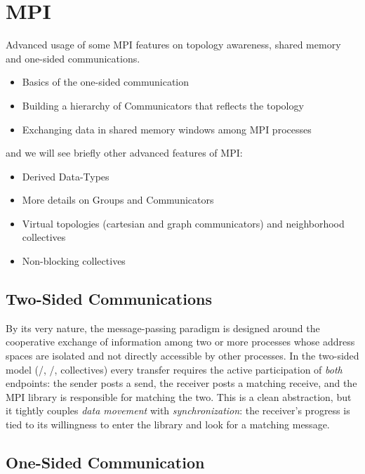 \chapter{MPI}

Advanced usage of some MPI features on topology awareness, shared memory and one-sided communications.

\begin{itemize}
    \item Basics of the one-sided communication
    \item Building a hierarchy of Communicators that reflects the topology
    \item Exchanging data in shared memory windows among MPI processes
\end{itemize}

and we will see briefly other advanced features of MPI:
\begin{itemize}
    \item Derived Data-Types
    \item More details on Groups and Communicators
    \item Virtual topologies (cartesian and graph communicators) and neighborhood collectives
    \item Non-blocking collectives
\end{itemize}

\section{Two-Sided Communications}

By its very nature, the message-passing paradigm is designed around the cooperative exchange of information among two or more processes whose address spaces are isolated and not directly accessible by other processes. In the two-sided model (/, /, collectives) every transfer requires the active participation of \emph{both} endpoints: the sender posts a send, the receiver posts a matching receive, and the MPI library is responsible for matching the two. This is a clean abstraction, but it tightly couples \emph{data movement} with \emph{synchronization}: the receiver's progress is tied to its willingness to enter the library and look for a matching message.

\section{One-Sided Communication}

